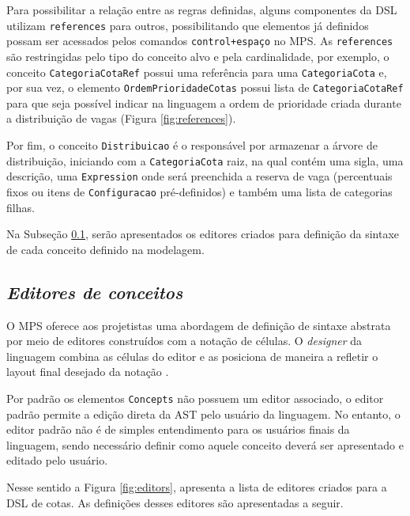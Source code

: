 Para possibilitar a relação entre as regras definidas, alguns componentes da \gls{DSL} utilizam \texttt{references} para outros, possibilitando que elementos já definidos possam ser acessados pelos comandos \texttt{control+espaço} no \gls{MPS}. As \texttt{references} são restringidas pelo tipo do conceito alvo e pela cardinalidade, por exemplo, o conceito \texttt{CategoriaCotaRef} possui uma referência para uma \texttt{CategoriaCota} e, por sua vez, o elemento \texttt{OrdemPrioridadeCotas} possui lista de \texttt{CategoriaCotaRef} para que seja possível indicar na linguagem a ordem de prioridade criada durante a distribuição de vagas (Figura \ref{fig:references}).



\newpage
Por fim, o conceito \texttt{Distribuicao} é o responsável por armazenar a árvore de distribuição, iniciando com a \texttt{CategoriaCota} raiz, na qual contém uma sigla, uma descrição, uma \texttt{Expression} onde será preenchida a reserva de vaga (percentuais fixos ou itens de \texttt{Configuracao} pré-definidos) e também uma lista de categorias filhas. 

Na Subseção \ref{sub:sec:editores}, serão apresentados os editores criados para definição da sintaxe de cada conceito definido na modelagem.


\subsection{\textit{Editores de conceitos}}
\label{sub:sec:editores}
O \gls{MPS} oferece aos projetistas uma abordagem de definição de sintaxe abstrata por meio de editores construídos com a notação de células. O \textit{designer} da linguagem combina as células do editor e as posiciona de maneira a refletir o layout final desejado da notação \cite{jetbrains}. 

Por padrão os elementos \texttt{Concepts} não possuem um editor associado, o editor padrão permite a edição direta da \gls{AST} pelo usuário da linguagem. No entanto, o editor padrão não é de simples entendimento para os usuários finais da linguagem, sendo necessário definir como aquele conceito deverá ser apresentado e editado pelo usuário.

Nesse sentido a Figura \ref{fig:editors}, apresenta a lista de editores criados para a DSL de cotas. As definições desses editores são apresentadas a seguir.




